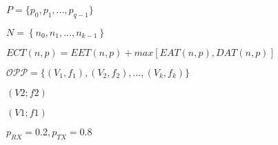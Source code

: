 \documentclass{article}
\begin{document}
$ P = \{p_0, p_1, ..., p_{q-1}\} $
\pagebreak

$N = \left\{n_0, n_1, ..., n_{k-1}\right\}$
\pagebreak

$ECT(n,p) = EET(n,p)+max[EAT(n,p),DAT(n,p)]$
\pagebreak

$\mathcal{OPP} = \{(V_1, f_1), (V_2, f_2), \ldots, (V_k,f_k)\}$
\pagebreak

$(V2; f2)$
\pagebreak

$(V1; f1)$
\pagebreak

$p_{RX} = 0.2, p_{TX} = 0.8$
\pagebreak
\end{document}
